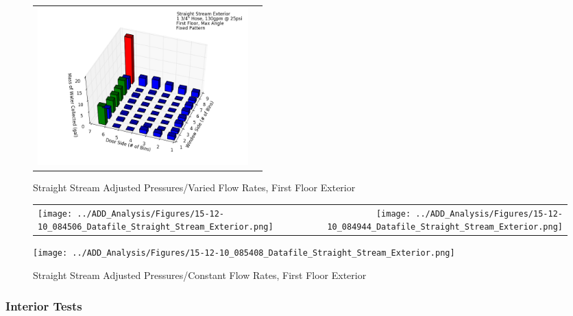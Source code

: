 \documentclass{article}
\begin{document}
\begin{appendices}
\begin{figure}[ht]
\begin{tabular*}{\textwidth}{lr}
\includegraphics[width=3.2in]{../ADD_Analysis/Figures/15-12-08_162547_Datafile_Straight_Stream_Exterior.png} \\
\end{tabular*}
\caption{Straight Stream Adjusted Pressures/Varied Flow Rates, First Floor Exterior}
\label{fig:Straight Stream Adjusted Pressures/Varied Flow Rates, First Floor Exterior}
\end{figure}

\clearpage

\begin{figure}[ht]
\begin{tabular*}{\textwidth}{lr}
\texttt{[image: ../ADD\_Analysis/Figures/15-12-10\_084506\_Datafile\_Straight\_Stream\_Exterior.png]} &
\texttt{[image: ../ADD\_Analysis/Figures/15-12-10\_084944\_Datafile\_Straight\_Stream\_Exterior.png]} \\
\end{tabular*}
\centering
\texttt{[image: ../ADD\_Analysis/Figures/15-12-10\_085408\_Datafile\_Straight\_Stream\_Exterior.png]}
\caption{Straight Stream Adjusted Pressures/Constant Flow Rates, First Floor Exterior}
\label{fig:Straight Stream Adjusted Pressures/Constant Flow Rates, First Floor Exterior}
\end{figure}

\clearpage

\subsubsection{Interior Tests}


\end{appendices}
\end{document}
